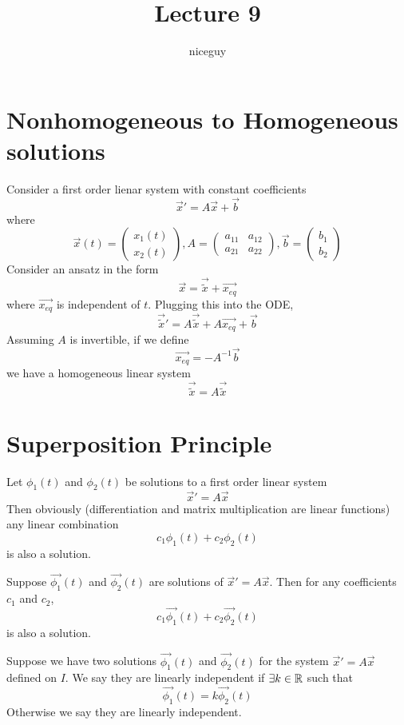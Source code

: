 \documentclass[12pt]{article}
\author{niceguy}
\title{Lecture 9}
\begin{document}
\maketitle

\section{Nonhomogeneous to Homogeneous solutions}
Consider a first order lienar system with constant coefficients
$$\vec{x}' = A\vec{x} + \vec{b}$$
where
$$\vec{x}(t) = \begin{pmatrix} x_1(t) \\ x_2(t) \end{pmatrix}, A = \begin{pmatrix} a_{11} & a_{12} \\ a_{21} & a_{22} \end{pmatrix}, \vec{b} = \begin{pmatrix} b_1 \\ b_2 \end{pmatrix}$$
Consider an ansatz in the form
$$\vec{x} = \vec{\tilde{x}} + \vec{x_{eq}}$$
where $\vec{x_{eq}}$ is independent of $t$.
Plugging this into the ODE,
$$\vec{\tilde{x}}' = A\vec{\tilde{x}} + A\vec{x_{eq}} + \vec{b}$$
Assuming $A$ is invertible, if we define
$$\vec{x_{eq}} = -A^{-1}\vec{b}$$
we have a homogeneous linear system
$$\vec{\tilde{x}} = A\vec{\tilde{x}}$$

\section{Superposition Principle}
Let $\phi_1(t)$ and $\phi_2(t)$ be solutions to a first order linear system
$$\vec{x}' = A\vec{x}$$
Then obviously (differentiation and matrix multiplication are linear functions) any linear combination
$$c_1\phi_1(t) + c_2\phi_2(t)$$
is also a solution.
\begin{thm}
	Suppose $\vec{\phi_1}(t)$ and $\vec{\phi_2}(t)$ are solutions of $\vec{x}' = A\vec{x}$. Then for any coefficients $c_1$ and $c_2$,
	$$c_1\vec{\phi_1}(t) + c_2\vec{\phi_2}(t)$$
	is also a solution.
\end{thm}
\begin{defn}
	Suppose we have two solutions $\vec{\phi_1}(t)$ and $\vec{\phi_2}(t)$ for the system $\vec{x}' = A\vec{x}$ defined on $I$. We say they are linearly independent if $\exists k \in \mathbb{R}$ such that
	$$\vec{\phi_1}(t) = k\vec{\phi_2}(t)$$
	Otherwise we say they are linearly independent.
\end{defn}
\end{document}
